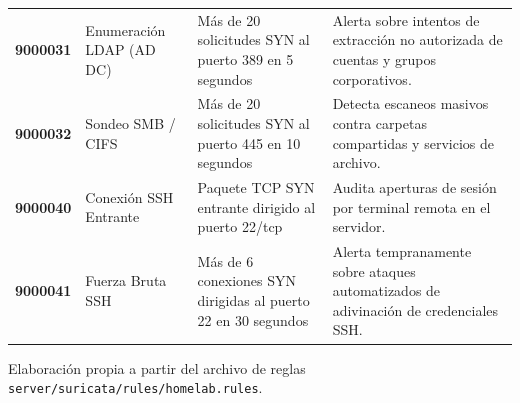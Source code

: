 \begin{table}[H]
{\begin{tablaAPA}
\begin{tabular}{C{1.6cm}L{3.6cm}L{5.0cm}L{4.8cm}}
  \textbf{9000031} & Enumeración LDAP (AD DC) & Más de 20 solicitudes SYN al puerto 389 en 5 segundos & Alerta sobre intentos de extracción no autorizada de cuentas y grupos corporativos. \\
  \textbf{9000032} & Sondeo SMB / CIFS & Más de 20 solicitudes SYN al puerto 445 en 10 segundos & Detecta escaneos masivos contra carpetas compartidas y servicios de archivo. \\
  \textbf{9000040} & Conexión SSH Entrante & Paquete TCP SYN entrante dirigido al puerto 22/tcp & Audita aperturas de sesión por terminal remota en el servidor. \\
  \textbf{9000041} & Fuerza Bruta SSH & Más de 6 conexiones SYN dirigidas al puerto 22 en 30 segundos & Alerta tempranamente sobre ataques automatizados de adivinación de credenciales SSH. \\
  \bottomrule
  \end{tabular}
  \end{tablaAPA}%
}{Elaboración propia a partir del archivo de reglas \texttt{server/suricata/rules/homelab.rules}.}
\end{table}

